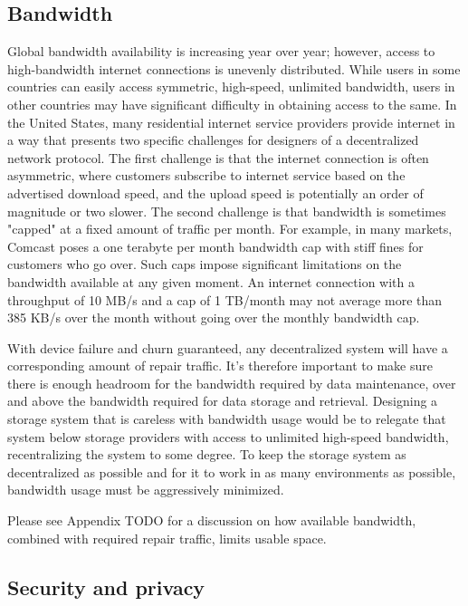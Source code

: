 \documentclass[a4paper,10pt]{article} \usepackage[utf8]{inputenc}
\newcommand{\todo}[1]{{\color{red} TODO #1 }}
\begin{document}
\subsection{Bandwidth}

Global bandwidth availability is increasing year over year; however, access to
high-bandwidth internet connections is unevenly distributed. While users in some
countries can easily access symmetric, high-speed, unlimited bandwidth, users in
other countries may have significant difficulty in obtaining access to the same.
In the United States, many residential internet service providers provide
internet in a way that presents two specific challenges for designers of a
decentralized network protocol. The first challenge is that the internet
connection is often asymmetric, where customers subscribe to internet service
based on the advertised download speed, and the upload speed is potentially an
order of magnitude or two slower. The second challenge is that bandwidth is
sometimes "capped" at a fixed amount of traffic per month. For example, in many
markets, Comcast poses a one terabyte per month bandwidth cap with stiff fines
for customers who go over. Such caps impose
significant limitations on the bandwidth available at any given moment.
An internet connection with a throughput of 10 MB/s and a cap of 1
TB/month may not average more than 385 KB/s over the month without going
over the monthly bandwidth cap.

With device failure and churn guaranteed, any decentralized system will have a
corresponding amount of repair traffic. It's therefore important to make sure
there is enough headroom for the bandwidth required by data maintenance, over
and above the bandwidth required for data storage and retrieval. Designing a
storage system that is careless with bandwidth usage would be to relegate that
system below storage providers with access to unlimited high-speed bandwidth,
recentralizing the system to some degree. To keep the storage system as
decentralized as possible and for it to work in as many environments as
possible, bandwidth usage must be aggressively minimized.

Please see Appendix \todo{} for a discussion on how available bandwidth,
combined with required repair traffic, limits usable space.

\subsection{Security and privacy}
\end{document}
